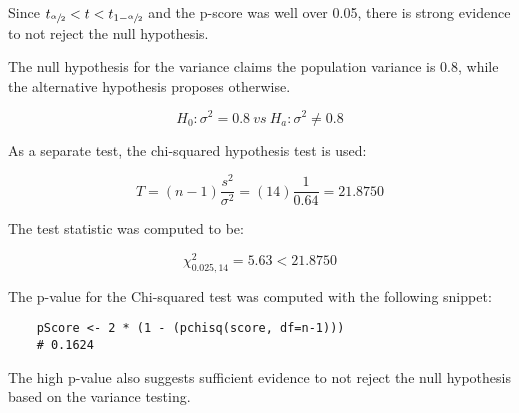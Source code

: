     Since $t_{\sfrac{\alpha}{2}} < t < t_{1-\sfrac{\alpha}{2}}$ and the p-score was well over 0.05, there is strong evidence to not reject the null hypothesis.\n

    The null hypothesis for the variance claims the population variance is 0.8, while the alternative hypothesis proposes otherwise.

        \[ H_{0}: \sigma^{2} = 0.8 \ vs \ H_{a}: \sigma^{2} \neq 0.8 \]

    As a separate test, the chi-squared hypothesis test is used:

    \begin{equation*}
        T=(n-1)\frac{s^{2}}{\sigma^{2}}
        =(14)\frac{1}{0.64}=21.8750
    \end{equation*}

    The test statistic was computed to be:

    \begin{equation*}
        {\chi}^{2}_{0.025, 14}=5.63<21.8750
    \end{equation*}

    The p-value for the Chi-squared test was computed with the following snippet:

\begin{lstlisting}
    pScore <- 2 * (1 - (pchisq(score, df=n-1)))
    # 0.1624
\end{lstlisting}

    The high p-value also suggests sufficient evidence to not reject the null hypothesis based on the variance testing.